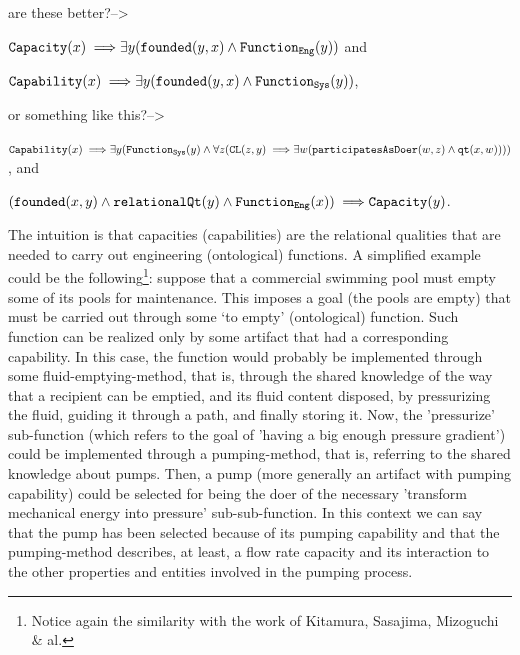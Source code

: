 \documentclass[sw]{iosart2x}
\newcommand{\bflist}{\begin{list}{}{\setlength{\topsep}{2mm}\setlength{\partopsep}{0mm}\setlength{\parsep}{0mm}\setlength{\leftmargin}{9mm}\setlength{\labelwidth}{8mm}}}
\newcommand{\eflist}{\end{list}}
\newcommand{\AxLabel}{\textrm{a}}
\newcounter{cntax}
\newcommand{\myax}[1]{\refstepcounter{cntax}\begin{small}{\bf \AxLabel\thecntax\label{ax:#1}}\end{small}}
\newcommand{\generalStyle}[1]{\texttt{#1}}
\newcommand{\biRel}[3]{\generalStyle{#1}(#2,#3)}
\newcommand{\uniRel}[2]{\generalStyle{#1}(#2)}
\newcommand{\uniRelPar}[3]{\generalStyle{#1}_{\generalStyle{#3}}(#2)}
\newcommand{\myfi}{\hspace{0.9mm} \Longrightarrow}
\newcommand{\DOLCEQualityDirect}[2]{\biRel{qt}{#1}{#2}}
\newcommand{\DOLCECLby}[2]{\biRel{CL}{#1}{#2}}
\newcommand{\Capability}[1]{\uniRel{Capability}{#1}}
\newcommand{\Capacity}[1]{\uniRel{Capacity}{#1}}
\newcommand{\RelationalQuality}[1]{\uniRel{relationalQt}{#1}}
\newcommand{\FunctionSys}[1]{\uniRelPar{Function}{#1}{Sys}}
\newcommand{\FunctionEng}[1]{\uniRelPar{Function}{#1}{Eng}}
\newcommand{\founded}[2]{\biRel{\foundedTerm{passive}}{#1}{#2}}
\newcommand{\participateAsDoer}[2]{\biRel{participatesAsDoer}{#1}{#2}}
\newcommand{\foundedTerm}[1]{%
  \ifthenelse{\equal{#1}{passive}}{founded}{%
    \ifthenelse{\equal{#1}{verb}}{found}{%
      \ifthenelse{\equal{#1}{gerund}}{founding}{%
        ERROR!%
      }%
    }%
  }%
}
\newcommand{\TODO}[1]{{\color{red} #1}}
\begin{document}
{\TODO{ are these better?-->
\bflist
  \item[\myax{capacityCostrBis}] $ \Capacity{x} \myfi \exists y (\founded{y}{x} \land \FunctionEng{y})$ and
  \item[\myax{capabilityCostrBis}] $ \Capability{x} \myfi \exists y (\founded{y}{x} \land \FunctionSys{y})$,
\eflist
}
\TODO{ or something like this?-->
\bflist
  \item[\myax{capabilityCostrTris}] $ \Capability{x} \myfi \exists y (\FunctionSys{y} \land \forall z(\DOLCECLby{z}{y} \myfi \exists w(\participateAsDoer{w}{z} \land \DOLCEQualityDirect{x}{w})))$, and
  \item[\myax{capacityCostrTris}] $ (\founded{x}{y} \land \RelationalQuality{y} \land \FunctionEng{x}) \myfi \Capacity{y}$. 
\eflist
}
The intuition is that capacities (capabilities) are the relational qualities that are needed to carry out engineering (ontological) functions.
A simplified example could be the following\footnote{Notice again the similarity with the work of Kitamura, Sasajima, Mizoguchi \& al.}: suppose that a commercial swimming pool must empty some of its pools for maintenance. This imposes a goal (the pools are empty) that must be carried out through some `to empty' (ontological) function. Such function can be realized only by some artifact that had a corresponding capability. In this case, the function would probably be implemented through some fluid-emptying-method, that is, through the shared knowledge of the way that a recipient can be emptied, and its fluid content disposed, by pressurizing the fluid, guiding it through a path, and finally storing it.
Now, the 'pressurize' sub-function (which refers to the goal of 'having a big enough pressure gradient') could be implemented through a pumping-method, that is, referring to the shared knowledge about pumps.
Then, a pump (more generally an artifact with pumping capability) could be selected for being the doer of the necessary 'transform mechanical energy into pressure' sub-sub-function.
In this context we can say that the pump has been selected because of its pumping capability and that the pumping-method describes, at least, a flow rate capacity and its interaction to the other properties and entities involved in the pumping process. 




}
\end{document}
